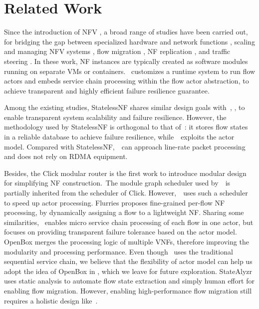 \section{Related Work}
\label{sec:nfvactor-related-work}

Since the introduction of NFV \cite{nfv-white-paper}, a broad range of studies have been carried out, for bridging the gap between specialized hardware and network functions \cite{hwang2015netvm, Han:EECS-2015-155, martins2014clickos, 199352}, scaling and managing NFV systems \cite{gember2012stratos, palkar2015e2}, flow migration \cite{rajagopalan2013split, khalid2016paving, gember2015opennf}, NF replication \cite{rajagopalan2013pico, sherry2015rollback}, and traffic steering \cite{simplifying}. In these work, NF instances are typically created as software modules running on separate VMs or containers. \nfactor~customizes a runtime system to run flow actors and embeds service chain processing within the flow actor abstraction, to achieve transparent and highly efficient failure resilience guarantee.


Among the existing studies, StatelessNF \cite{201545} shares similar design goals with~\nfactor, \ie, to enable transparent system scalability and failure resilience. However, the methodology used by StatelessNF is orthogonal to that of~\nfactor: it stores flow states in a reliable database \cite{ongaro2011fast} to achieve failure resilience, while~\nfactor~exploits the actor model. Compared with StatelessNF,~\nfactor~can approach line-rate packet processing and does not rely on RDMA equipment.

Besides, the Click modular router \cite{kohler2000click} is the first work to introduce modular design for simplifying NF construction.~The module graph scheduler used by~\nfactor~is partially inherited from the scheduler of Click. However,~\nfactor~uses such a scheduler to speed up actor processing. Flurries \cite{zhang2016flurries} proposes fine-grained per-flow NF processing, by dynamically assigning a flow to a lightweight NF. Sharing some similarities, \nfactor~enables micro service chain processing of each flow in one actor, but focuses on providing transparent failure tolerance based on the actor model. OpenBox \cite{OpenBox} merges the processing logic of multiple VNFs, therefore improving the modularity and processing performance. Even though \nfactor~uses the traditional sequential service chain, we believe that the flexibility of actor model can help us adopt the idea of OpenBox in \nfactor, which we leave for future exploration. StateAlyzr \cite{khalid2016paving} uses static analysis to automate flow state extraction and simply human effort for enabling flow migration. However, enabling high-performance flow migration still requires a holistic design like~\nfactor.

